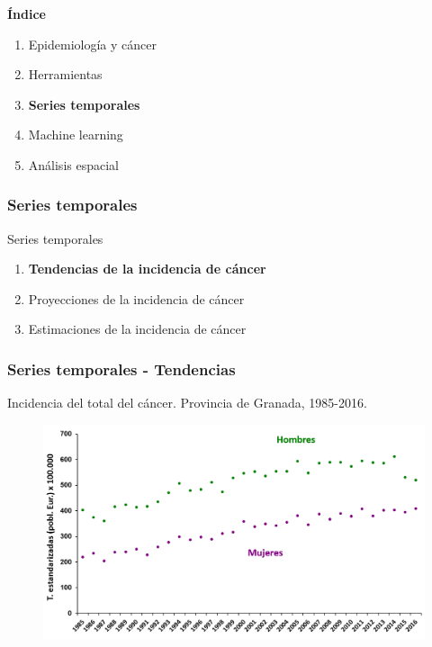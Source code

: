 \documentclass{beamer}
\begin{document}

\begin{frame}\frametitle{}
	\Large{\textbf{Índice}}\\[2ex]
	\normalsize
	\begin{enumerate}
		\item Epidemiología y cáncer\\[2ex]
		\item Herramientas\\[2ex]
		\item \textbf{Series temporales} \\[2ex]
		\item Machine learning  \\[2ex]
		\item Análisis espacial \\[2ex]
	\end{enumerate}
\end{frame}


\begin{frame}\frametitle{Series temporales}
	\begin{block}{Series temporales}
		\begin{enumerate}
			\item \textbf{Tendencias de la incidencia de cáncer}\\[2ex]
			\item Proyecciones de la incidencia de cáncer\\[2ex]
			\item Estimaciones de la incidencia de cáncer\\[2ex]
		\end{enumerate}
	\end{block}
\end{frame}


\begin{frame}\frametitle{Series temporales - Tendencias}
	\centering
	Incidencia del total del cáncer. Provincia de Granada, 1985-2016.
	\begin{figure}
		\centering
		\includegraphics[width=\textwidth]{images/tendencias0.png}
	\end{figure}
\end{frame}
\end{document}
